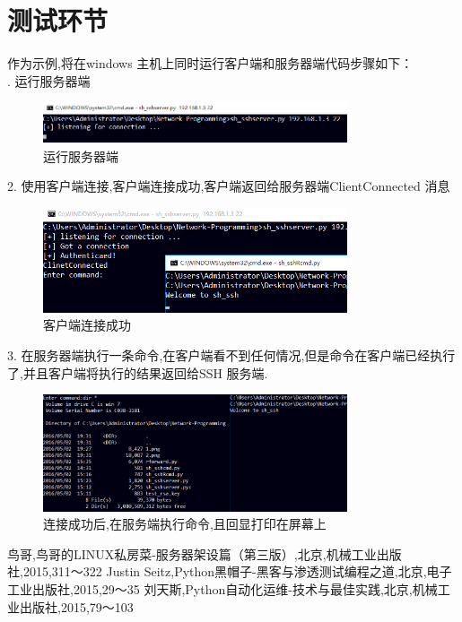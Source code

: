 \documentclass[UTF8,a4paper,cs4size]{ctexart}
\begin{document}
\newpage

\section{测试环节}
作为示例,将在windows 主机上同时运行客户端和服务器端代码步骤如下：\\
. 运行服务器端
\begin{figure}[htbp]
\begin{center}
  \includegraphics[width=0.8\textwidth]{1.png}
  \caption{运行服务器端}
\end{center}
\end{figure}

2. 使用客户端连接,客户端连接成功,客户端返回给服务器端ClientConnected 消息\\
\begin{figure}[htbp]
\begin{center}
  \includegraphics[width=0.8\textwidth]{2.png}
  \caption{客户端连接成功}
\end{center}
\end{figure}

3. 在服务器端执行一条命令,在客户端看不到任何情况,但是命令在客户端已经执行了,并且客户端将执行的结果返回给SSH 服务端.\\

\begin{figure}[htbp]
\begin{center}
  \includegraphics[width=0.8\textwidth]{3.png}
  \caption{连接成功后,在服务端执行命令,且回显打印在屏幕上}
\end{center}
\end{figure}


\newpage
\begin{thebibliography}{99}

鸟哥,鸟哥的LINUX私房菜-服务器架设篇（第三版）,北京,机械工业出版社,2015,311～322
Justin Seitz,Python黑帽子-黑客与渗透测试编程之道,北京,电子工业出版社,2015,29～35
刘天斯,Python自动化运维-技术与最佳实践,北京,机械工业出版社,2015,79～103

\end{thebibliography}
\end{document}
